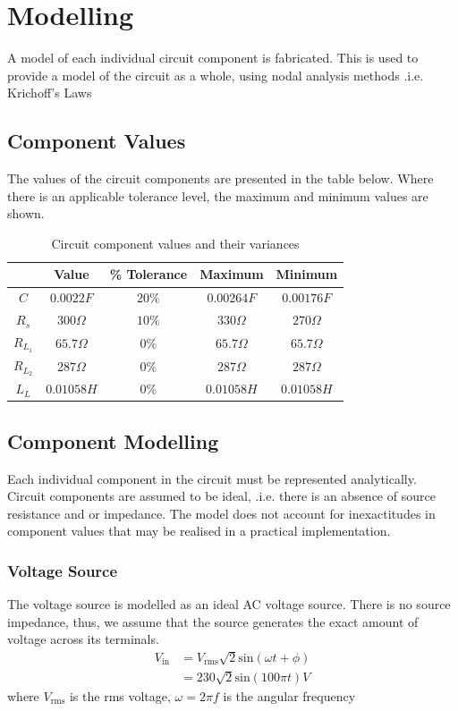 \section{Modelling}
A model of each individual circuit component is fabricated. This is used to provide a model of the circuit as a whole, using nodal analysis methods .i.e. Krichoff's Laws

\subsection{Component Values}
The values of the circuit components are presented in the table below. Where there is an applicable tolerance level, the maximum and minimum values are shown. 
\begin{table}[H]
    \centering
    \begin{tabular}{|c|c|c||c|c|}\hline
        & Value & \% Tolerance & \textbf{Maximum} & \textbf{Minimum} \\\hline
       $C$ & $0.0022 F$ & $20\%$ & $0.00264F$ & $0.00176F$ \\
       $R_s$ & $300\Omega$ & $10\%$ & $330\Omega$ & $270\Omega$ \\
       $R_{L_1}$ & $65.7\Omega$ & $0\%$ & $65.7\Omega$  & $65.7\Omega$ \\
       $R_{L_2}$ & $287\Omega$ & $0\%$ & $287\Omega$ & $287\Omega$ \\
       $L_L$ & $0.01058 H$ & $0\%$ & $0.01058 H$ & $0.01058 H$ \\\hline
    \end{tabular}
    \caption{Circuit component values and their variances}
    \label{tab:component_values}
\end{table}

\subsection{Component Modelling}
Each individual component in the circuit must be represented analytically. Circuit components are assumed to be ideal, .i.e. there is an absence of source resistance and or impedance. The model does not account for inexactitudes in component values that may be realised in a practical implementation. 

\subsubsection{Voltage Source} The voltage source is modelled as an ideal AC voltage source. There is no source impedance, thus, we assume that the source generates the exact amount of voltage across its terminals. 
\begin{equation}
    \begin{split}
        V_{\text{in}} &= V_{\text{rms}}\sqrt{2}\text{sin}(\omega t + \phi)
            \\ &= 230\sqrt{2}\text{sin}(100\pi t)V
    \end{split}
\end{equation}
where $V_{\text{rms}}$ is the rms voltage, $\omega = 2\pi f$ is the angular frequency

